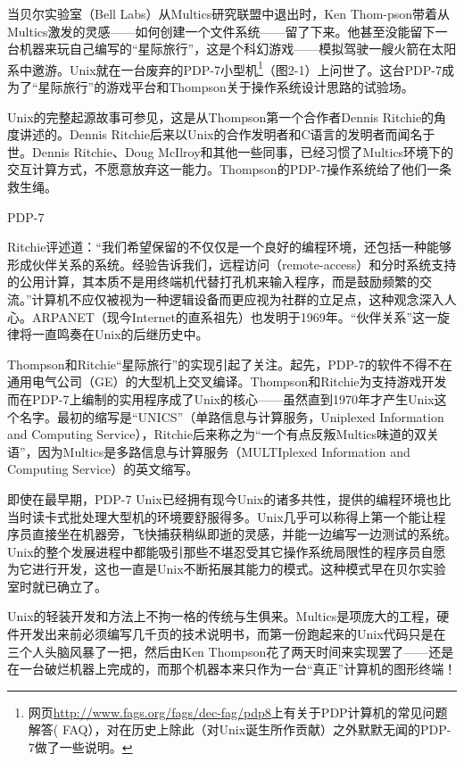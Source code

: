 \documentclass[12pt,oneside]{book}
\begin{document}
\begin{common-format}
当贝尔实验室（Bell Labs）从Multics研究联盟中退出时，Ken Thom-pson带着从Multics激发的灵感——如何创建一个文件系统——留了下来。他甚至没能留下一台机器来玩自己编写的“星际旅行”，这是个科幻游戏——模拟驾驶一艘火箭在太阳系中邀游。Unix就在一台废弃的PDP-7小型机\footnote{网页\href{http://www.fags.org/fags/dec-fag/pdp8}{http://www.fags.org/fags/dec-fag/pdp8}上有关于PDP计算机的常见问题解答( FAQ），对在历史上除此（对Unix诞生所作贡献）之外默默无闻的PDP-7做了一些说明。}（图2-1）上问世了。这台PDP-7成为了“星际旅行”的游戏平台和Thompson关于操作系统设计思路的试验场。

Unix的完整起源故事可参见\cite{Ritchie79}，这是从Thompson第一个合作者Dennis Ritchie的角度讲述的。Dennis Ritchie后来以Unix的合作发明者和C语言的发明者而闻名于世。Dennis Ritchie、Doug McIlroy和其他一些同事，已经习惯了Multics环境下的交互计算方式，不愿意放弃这一能力。Thompson的PDP-7操作系统给了他们一条救生绳。

\begin{fig}[2]{PDP-7}
\label{fig:PDP-7}
\end{fig}

Ritchie评述道：“我们希望保留的不仅仅是一个良好的编程环境，还包括一种能够形成伙伴关系的系统。经验告诉我们，远程访问（remote-access）和分时系统支持的公用计算，其本质不是用终端机代替打孔机来输入程序，而是鼓励频繁的交流。”计算机不应仅被视为一种逻辑设备而更应视为社群的立足点，这种观念深入人心。ARPANET（现今Internet的直系祖先）也发明于1969年。“伙伴关系”这一旋律将一直鸣奏在Unix的后继历史中。

Thompson和Ritchie“星际旅行”的实现引起了关注。起先，PDP-7的软件不得不在通用电气公司（GE）的大型机上交叉编译。Thompson和Ritchie为支持游戏开发而在PDP-7上编制的实用程序成了Unix的核心——虽然直到1970年才产生Unix这个名字。最初的缩写是“UNICS”（单路信息与计算服务，Uniplexed Information and Computing Service），Ritchie后来称之为“一个有点反叛Multics味道的双关语”，因为Multics是多路信息与计算服务（MULTIplexed Information and Computing Service）的英文缩写。

即使在最早期，PDP-7 Unix已经拥有现今Unix的诸多共性，提供的编程环境也比当时读卡式批处理大型机的环境要舒服得多。Unix几乎可以称得上第一个能让程序员直接坐在机器旁，飞快捕获稍纵即逝的灵感，并能一边编写一边测试的系统。Unix的整个发展进程中都能吸引那些不堪忍受其它操作系统局限性的程序员自愿为它进行开发，这也一直是Unix不断拓展其能力的模式。这种模式早在贝尔实验室时就已确立了。

Unix的轻装开发和方法上不拘一格的传统与生俱来。Multics是项庞大的工程，硬件开发出来前必须编写几千页的技术说明书，而第一份跑起来的Unix代码只是在三个人头脑风暴了一把，然后由Ken Thompson花了两天时间来实现罢了——还是在一台破烂机器上完成的，而那个机器本来只作为一台“真正”计算机的图形终端！


\end{common-format}
\end{document}

